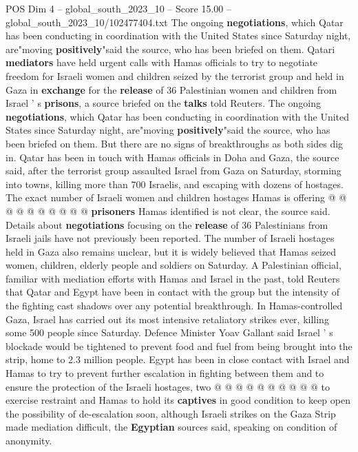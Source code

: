 \begin{textsample}{POS Dim 4 – global\_south\_2023\_10 – Score 15.00 – global\_south\_2023\_10/102477404.txt}  \label{ex:f4_pos_431}
The ongoing \textbf{negotiations}, which Qatar has been conducting in coordination with the United States since Saturday night, are"moving \textbf{positively}"said the source, who has been briefed on them.
Qatari \textbf{mediators} have held urgent calls with Hamas officials to try to negotiate freedom for Israeli women and children seized by the terrorist group and held in Gaza in \textbf{exchange} for the \textbf{release} of 36 Palestinian women and children from Israel ' s \textbf{prisons}, a source briefed on the \textbf{talks} told Reuters.
The ongoing \textbf{negotiations}, which Qatar has been conducting in coordination with the United States since Saturday night, are"moving \textbf{positively}"said the source, who has been briefed on them.
But there are no signs of breakthroughs as both sides dig in.
Qatar has been in touch with Hamas officials in Doha and Gaza, the source said, after the terrorist group assaulted Israel from Gaza on Saturday, storming into towns, killing more than 700 Israelis, and escaping with dozens of hostages.
The exact number of Israeli women and children hostages Hamas is offering @ @ @ @ @ @ @ @ @ @ \textbf{prisoners} Hamas identified is not clear, the source said.
Details about \textbf{negotiations} focusing on the \textbf{release} of 36 Palestinians from Israeli jails have not previously been reported.
The number of Israeli hostages held in Gaza also remains unclear, but it is widely believed that Hamas seized women, children, elderly people and soldiers on Saturday.
A Palestinian official, familiar with mediation efforts with Hamas and Israel in the past, told Reuters that Qatar and Egypt have been in contact with the group but the intensity of the fighting cast shadows over any potential breakthrough.
In Hamas-controlled Gaza, Israel has carried out its most intensive retaliatory strikes ever, killing some 500 people since Saturday.
Defence Minister Yoav Gallant said Israel ' s blockade would be tightened to prevent food and fuel from being brought into the strip, home to 2.3 million people.
Egypt has been in close contact with Israel and Hamas to try to prevent further escalation in fighting between them and to ensure the protection of the Israeli hostages, two @ @ @ @ @ @ @ @ @ @ to exercise restraint and Hamas to hold its \textbf{captives} in good condition to keep open the possibility of de-escalation soon, although Israeli strikes on the Gaza Strip made mediation difficult, the \textbf{Egyptian} sources said, speaking on condition of anonymity.

\end{textsample}

